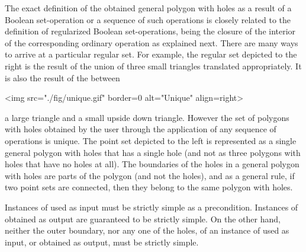 The exact definition of the obtained general polygon with holes as a
result of a Boolean set-operation or a sequence of such operations is
closely related to the definition of regularized Boolean 
set-operations, being the closure of the interior of the corresponding
ordinary operation as explained next. There are many ways to arrive at a 
particular regular set. For example, the regular set depicted to the right 
is the result of the union of three small triangles translated 
appropriately. It is also the result of the
 between
\lcTex{%
  \setlength{\widthRight}{1.4cm}
  \setlength{\widthLeft}{\widthLineReal}
  \addtolength{\widthLeft}{-\widthRight}
  \begin{minipage}{\widthLeft}
}
\label{fig:unique}
\begin{ccHtmlOnly}
  <img src="./fig/unique.gif" border=0 alt="Unique" align=right>
\end{ccHtmlOnly}
a large triangle and a small upside down triangle. However the set of 
polygons with holes obtained by the user through the application of any 
sequence of operations is unique. 
The point set depicted to the left is represented 
as a single general polygon with holes that has a single hole 
(and not as three polygons with holes that have no holes at all). The
boundaries of the holes in a general polygon with holes are parts of the 
polygon (and not the holes), and as a general rule, if two point sets are
connected, then they belong to the same polygon with holes.
 
Instances of  used as input must be strictly simple
as a precondition. Instances of  obtained as output
are guaranteed to be strictly simple. On the other hand, neither the outer
boundary, nor any one of the holes, of an instance of
 used as input, or obtained as output,
must be strictly simple.

